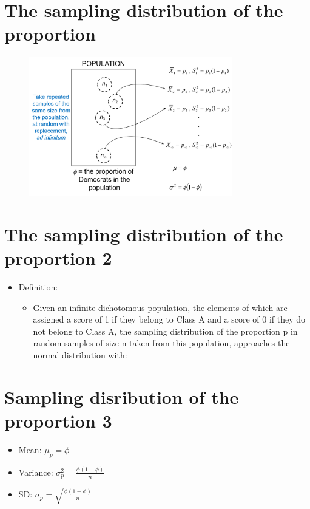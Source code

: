 \documentclass[12pt]{article}
\begin{document}
\section{The sampling distribution of the
proportion}\label{the-sampling-distribution-of-the-proportion}

\begin{figure}[H]
\centering
\includegraphics[width=3.5in]{sample_dist_proportion.png}
\caption{}
\end{figure}

\section{The sampling distribution of the proportion
2}\label{the-sampling-distribution-of-the-proportion-2}

\begin{itemize}
\itemsep1pt\parskip0pt
\item
  Definition:

  \begin{itemize}
  \itemsep1pt\parskip0pt
  \item
    Given an infinite dichotomous population, the elements of which are
    assigned a score of 1 if they belong to Class A and a score of 0 if
    they do not belong to Class A, the sampling distribution of the
    proportion p in random samples of size n taken from this population,
    approaches the normal distribution with:
  \end{itemize}
\end{itemize}

\section{Sampling disribution of the proportion
3}\label{sampling-disribution-of-the-proportion-3}

\begin{itemize}
\itemsep1pt\parskip0pt
\item
  Mean: \(\mu_{p} = \phi\)
\item
  Variance: \(\sigma_{p}^{2} = \frac{\phi (1 - \phi)}{n}\)
\item
  SD: \(\sigma_{p} = \sqrt{\frac{\phi (1 - \phi)}{n}}\)
\end{itemize}
\end{document}

